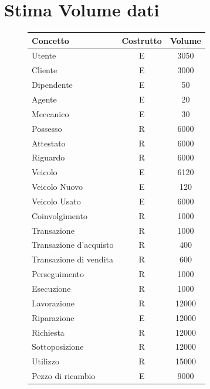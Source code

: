 \documentclass[a4paper,12pt]{report}
\begin{document}
\section{Stima Volume dati}
\begin{figure}[H]
	\fontsize{14pt}{12pt}\selectfont
	\advance\leftskip-15cm
	\centering
	\begin{tabular}{l c c }
		\rowcolor{BlueGreen}
		\rule[-3mm]{0mm}{0.85cm}
		\textbf{Concetto} & \textbf{Costrutto} &\textbf{Volume} \\
		\hline\rule[-2mm]{0mm}{0.75cm}
		Utente & E & 3050\\
		\hline\rule[-2mm]{0mm}{0.75cm}
		Cliente & E & 3000 \\
		\hline\rule[-2mm]{0mm}{0.75cm}
		Dipendente & E & 50\\
		\hline\rule[-2mm]{0mm}{0.75cm}
		Agente & E & 20\\
		\hline\rule[-2mm]{0mm}{0.75cm}
		Meccanico & E & 30\\
		\hline\rule[-2mm]{0mm}{0.75cm}
		Possesso & R & 6000 \\
		\hline\rule[-2mm]{0mm}{0.75cm}
		Attestato & R & 6000\\
		\hline\rule[-2mm]{0mm}{0.75cm}
		Riguardo & R & 6000 \\
		\hline\rule[-2mm]{0mm}{0.75cm}
		Veicolo & E & 6120 \\
		\hline\rule[-2mm]{0mm}{0.75cm}
		Veicolo Nuovo & E & 120 \\
		\hline\rule[-2mm]{0mm}{0.75cm}
		Veicolo Usato & E & 6000 \\
		\hline\rule[-2mm]{0mm}{0.75cm}
		Coinvolgimento & R & 1000\\
		\hline\rule[-2mm]{0mm}{0.75cm}
		Transazione & R & 1000\\
		\hline\rule[-2mm]{0mm}{0.75cm}
		Transazione d'acquisto& R & 400\\
		\hline\rule[-2mm]{0mm}{0.75cm}
		Transazione di vendita& R & 600\\
		\hline\rule[-2mm]{0mm}{0.75cm}
		Perseguimento & R & 1000\\
		\hline\rule[-2mm]{0mm}{0.75cm}
		Esecuzione & R & 1000\\
		\hline\rule[-2mm]{0mm}{0.75cm}
		Lavorazione & R & 12000\\
		\hline\rule[-2mm]{0mm}{0.75cm}
		Riparazione & E & 12000\\
		\hline\rule[-2mm]{0mm}{0.75cm}
		Richiesta & R & 12000\\
		\hline\rule[-2mm]{0mm}{0.75cm}
		Sottoposizione & R & 12000\\
		\hline\rule[-2mm]{0mm}{0.75cm}
		Utilizzo & R & 15000\\
		\hline\rule[-2mm]{0mm}{0.75cm}
		Pezzo di ricambio & E &  9000\\
		\hline
	\end{tabular}
\end{figure}
\end{document}
